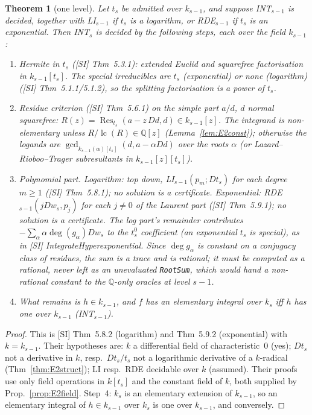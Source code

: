 \documentclass[11pt]{article}
\newtheorem{theorem}{Theorem}[section]
\theoremstyle{definition}
\theoremstyle{remark}
\newcommand{\Q}{\mathbb{Q}}
\newcommand{\lc}{\operatorname{lc}}
\newcommand{\code}[1]{\texttt{#1}}
\begin{document}
\begin{theorem}[one level]\label{thm:E2level}
Let $t_s$ be admitted over $k_{s-1}$, and suppose INT$_{s-1}$ is decided, together with
LI$_{s-1}$ if $t_s$ is a logarithm, or RDE$_{s-1}$ if $t_s$ is an exponential. Then INT$_s$
is decided by the following steps, each over the field $k_{s-1}$:
\begin{enumerate}
\item \emph{Hermite} in $t_s$ ([SI] Thm~5.3.1): extended Euclid and squarefree factorisation
  in $k_{s-1}[t_s]$. The special irreducibles are $t_s$ (exponential) or none (logarithm)
  ([SI] Thm~5.1.1/5.1.2), so the splitting factorisation is a power of $t_s$.
\item \emph{Residue criterion} ([SI] Thm~5.6.1) on the simple part $a/d$, $d$ normal
  squarefree: $R(z)=\operatorname{Res}_{t_s}(a-z\,Dd,d)\in k_{s-1}[z]$. The integrand is
  non-elementary unless $R/\lc(R)\in\Q[z]$ (Lemma~\ref{lem:E2const}); otherwise the logands
  are $\gcd_{k_{s-1}(\alpha)[t_s]}(d,a-\alpha Dd)$ over the roots $\alpha$ (or Lazard--Rioboo--Trager
  subresultants in $k_{s-1}[z][t_s]$).
\item \emph{Polynomial part.} Logarithm: top down, LI$_{s-1}(p_m;Dt_s)$ for each degree
  $m\ge1$ ([SI] Thm~5.8.1); no solution is a certificate. Exponential: RDE$_{s-1}(jDw_s,p_j)$
  for each $j\ne0$ of the Laurent part ([SI] Thm~5.9.1); no solution is a certificate. The
  log part's remainder contributes $-\sum_\alpha\alpha\deg(g_\alpha)Dw_s$ to the $t_s^0$
  coefficient (an exponential $t_s$ is special), as in [SI] IntegrateHyperexponential. Since
  $\deg g_\alpha$ is constant on a conjugacy class of residues, the sum is a trace and is
  rational; it must be \emph{computed} as a rational, never left as an unevaluated
  \code{RootSum}, which would hand a non-rational constant to the $\Q$-only oracles at level
  $s-1$.
\item What remains is $h\in k_{s-1}$, and $f$ has an elementary integral over $k_s$ iff $h$
  has one over $k_{s-1}$ (INT$_{s-1}$).
\end{enumerate}
\end{theorem}
\begin{proof}
This is [SI] Thm~5.8.2 (logarithm) and Thm~5.9.2 (exponential) with $k=k_{s-1}$. Their
hypotheses are: $k$ a differential field of characteristic~0 (yes); $Dt_s$ not a derivative
in $k$, resp.\ $Dt_s/t_s$ not a logarithmic derivative of a $k$-radical
(Thm~\ref{thm:E2struct}); LI resp.\ RDE decidable over $k$ (assumed). Their proofs use
only field operations in $k[t_s]$ and the constant field of $k$, both supplied by
Prop.~\ref{prop:E2field}. Step~4: $k_s$ is an elementary extension of $k_{s-1}$, so an
elementary integral of $h\in k_{s-1}$ over $k_s$ is one over $k_{s-1}$, and conversely.
\end{proof}
\end{document}
